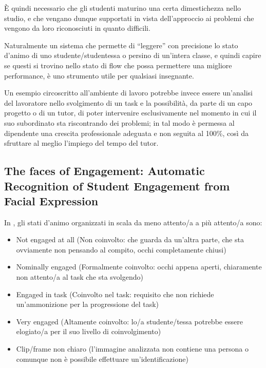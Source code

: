 È quindi necessario che gli studenti maturino una certa dimestichezza nello studio, e che vengano dunque supportati in vista dell’approccio ai problemi che vengono da loro riconosciuti in quanto difficili.

Naturalmente un sistema che permette di “leggere” con precisione lo stato d’animo di uno studente/studentessa o persino di un’intera classe, e quindi capire se questi si trovino nello stato di flow che possa permettere una migliore performance, è uno strumento utile per qualsiasi insegnante.

Un esempio circoscritto all’ambiente di lavoro potrebbe invece essere un’analisi del lavoratore nello svolgimento di un task e la possibilità, da parte di un capo progetto o di un tutor, di poter intervenire esclusivamente nel momento in cui il suo subordinato sta riscontrando dei problemi; in tal modo è permessa al dipendente una crescita professionale adeguata e non seguita al 100\%, così da sfruttare al meglio l’impiego del tempo del tutor.

\subsection {The faces of Engagement: Automatic Recognition of Student Engagement from Facial Expression}

In \cite{FacesOfEngagement}, gli stati d’animo organizzati in scala da meno attento/a a più attento/a sono:
\begin{itemize}
    \item Not engaged at all (Non coinvolto: che guarda da un’altra parte, che sta ovviamente non pensando al compito, occhi completamente chiusi)
    \item Nominally engaged (Formalmente coinvolto: occhi appena aperti, chiaramente non attento/a al task che sta svolgendo)
    \item Engaged in task (Coinvolto nel task: requisito che non richiede un’ammonizione per la progressione del task)
    \item Very engaged (Altamente coinvolto: lo/a studente/tessa potrebbe essere elogiato/a per il suo livello di coinvolgimento)
    \item Clip/frame non chiaro (l’immagine analizzata non contiene una persona o comunque non è possibile effettuare un’identificazione)
\end{itemize}

